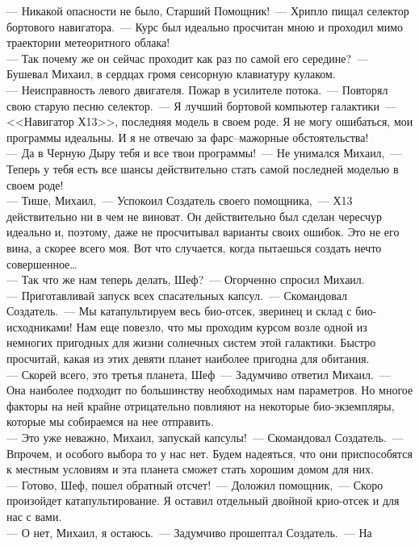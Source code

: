 --- Никакой опасности не было, Старший 
Помощник!~--- Хрипло пищал селектор бортового навигатора.~--- Курс был 
идеально просчитан мною и проходил мимо траектории метеоритного облака!\\
--- Так почему же он сейчас проходит как раз по самой его середине?~--- 
Бушевал Михаил, в сердцах громя сенсорную клавиатуру кулаком.\\
--- Неисправность левого двигателя. Пожар в усилителе потока.~--- Повторял 
свою старую песню селектор.~--- Я лучший бортовой компьютер галактики~--- 
<<Навигатор Х13>>, последняя модель в своем роде. Я не могу ошибаться, мои
программы идеальны. И я не отвечаю за фарс--мажорные обстоятельства!\\
--- Да в Черную Дыру тебя и все твои программы!~--- Не унимался Михаил,~--- 
Теперь у тебя есть все шансы действительно стать самой последней моделью
в своем роде!\\ 
--- Тише, Михаил,~--- Успокоил Создатель своего помощника,~--- 
Х13 действительно ни в чем не виноват. Он действительно был сделан 
чересчур идеально и, поэтому, даже не просчитывал варианты своих ошибок.
Это не его вина, а скорее всего моя. Вот что случается, когда пытаешься
создать нечто совершенное\ldots\\
--- Так что же нам теперь делать, Шеф?~--- Огорченно спросил Михаил.\\
--- Приготавливай запуск всех спасательных капсул.~--- Скомандовал 
Создатель.~--- Мы катапультируем весь био-отсек, зверинец и склад с 
био-исходниками!
Нам еще повезло, что мы проходим курсом возле одной из немногих 
пригодных для жизни солнечных систем этой галактики. Быстро просчитай, 
какая из этих девяти планет наиболее пригодна для обитания.\\
--- Скорей всего, это третья планета, Шеф~--- Задумчиво ответил Михаил.~--- Она 
наиболее подходит по большинству необходимых нам параметров. Но многое 
факторы на ней крайне отрицательно повлияют на некоторые био-экземпляры,
которые мы собираемся на нее отправить.\\
--- Это уже неважно, Михаил, 
запускай капсулы!~--- Скомандовал Создатель.~--- Впрочем, и особого выбора 
то у нас нет. Будем надеяться, что они приспособятся к местным условиям и
эта планета сможет стать хорошим домом для них.\\ 
--- Готово, Шеф, пошел 
обратный отсчет!~--- Доложил помощник,~--- Скоро произойдет 
катапультирование. Я оставил отдельный двойной крио-отсек и для нас с 
вами.\\ 
--- О нет, Михаил, я остаюсь.~--- Задумчиво прошептал Создатель.~--- На 
